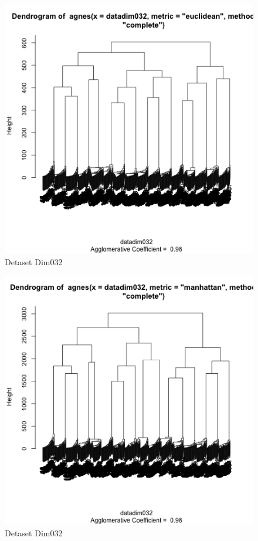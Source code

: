 \documentclass{article}
\begin{document}
\begin{figure}[ht!]
\caption{Detaset Dim032}
\centering
\includegraphics[width=1\textwidth]{plots/ang1dim032.png}
\end{figure}

\begin{figure}[ht!]
\caption{Detaset Dim032}
\centering
\includegraphics[width=1\textwidth]{plots/ang2dim032.png}
\end{figure}
\end{document}
